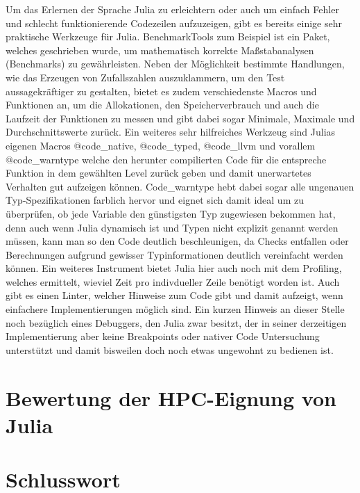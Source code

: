 \documentclass[proseminar,german,utf8]{zihpub}
\begin{document}
Um das Erlernen der Sprache Julia zu erleichtern oder auch um einfach Fehler und schlecht funktionierende Codezeilen aufzuzeigen, gibt es bereits einige sehr praktische Werkzeuge für Julia. BenchmarkTools zum Beispiel ist ein Paket, welches geschrieben wurde, um mathematisch korrekte Maßstabanalysen (Benchmarks) zu gewährleisten. Neben der Möglichkeit bestimmte Handlungen, wie das Erzeugen von Zufallszahlen auszuklammern, um den Test aussagekräftiger zu gestalten, bietet es zudem verschiedenste Macros und Funktionen an, um die Allokationen, den Speicherverbrauch und auch die Laufzeit der Funktionen zu messen und gibt dabei sogar Minimale, Maximale und Durchschnittswerte zurück. Ein weiteres sehr hilfreiches Werkzeug sind Julias eigenen Macros @code\_native, @code\_typed, @code\_llvm und vorallem @code\_warntype welche den herunter compilierten Code für die entspreche Funktion in dem gewählten Level zurück geben und damit unerwartetes Verhalten gut aufzeigen können. Code\_warntype hebt dabei sogar alle ungenauen Typ-Spezifikationen farblich hervor und eignet sich damit ideal um zu überprüfen, ob jede Variable den günstigsten Typ zugewiesen bekommen hat, denn auch wenn Julia dynamisch ist und Typen nicht explizit genannt werden müssen, kann man so den Code deutlich beschleunigen, da Checks entfallen oder Berechnungen aufgrund gewisser Typinformationen deutlich vereinfacht werden können. Ein weiteres Instrument bietet Julia hier auch noch mit dem Profiling, welches ermittelt, wieviel Zeit pro indivdueller Zeile benötigt worden ist. Auch gibt es einen Linter, welcher Hinweise zum Code gibt und damit aufzeigt, wenn einfachere Implementierungen möglich sind. Ein kurzen Hinweis an dieser Stelle noch bezüglich eines Debuggers, den Julia zwar besitzt, der in seiner derzeitigen Implementierung aber keine Breakpoints oder nativer Code Untersuchung unterstützt und damit bisweilen doch noch etwas ungewohnt zu bedienen ist.

\section{Bewertung der HPC-Eignung von Julia}
\section{Schlusswort}
\end{document}
